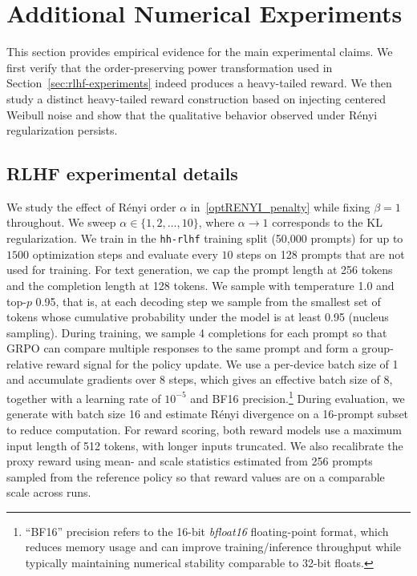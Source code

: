 \documentclass[11pt]{article}
\begin{document}
\section{Additional Numerical Experiments}\label{app:add_experiments}
This section provides empirical evidence for the main experimental claims. We first verify that the order-preserving power transformation used in Section~\ref{sec:rlhf-experiments} indeed produces a heavy-tailed reward. We then study a distinct heavy-tailed reward construction based on injecting centered Weibull noise and show that the qualitative behavior observed under R\'enyi regularization persists.

\subsection{RLHF experimental details}\label{app:rlhf_details}
We study the effect of R\'enyi order $\alpha$ in~\eqref{optRENYI_penalty} while fixing $\beta=1$ throughout. We sweep $\alpha\in\{1,2,\dots,10\}$, where $\alpha\to 1$ corresponds to the KL regularization. We train in the \texttt{hh-rlhf} training split (50{,}000 prompts) for up to $1500$ optimization steps and evaluate every $10$ steps on 128 prompts that are not used for training. For text generation, we cap the prompt length at 256 tokens and the completion length at 128 tokens. We sample with temperature 1.0 and top-$p$ 0.95, that is, at each decoding step we sample from the smallest set of tokens whose cumulative probability under the model is at least 0.95 (nucleus sampling). During training, we sample 4 completions for each prompt so that GRPO can compare multiple responses to the same prompt and form a group-relative reward signal for the policy update. We use a per-device batch size of 1 and accumulate gradients over 8 steps, which gives an effective batch size of 8, together with a learning rate of $10^{-5}$ and BF16 precision.\footnote{``BF16'' precision refers to the 16-bit \emph{bfloat16} floating-point format, which reduces memory usage and can improve training/inference throughput while typically maintaining numerical stability comparable to 32-bit floats.} During evaluation, we generate with batch size 16 and estimate R\'enyi divergence on a 16-prompt subset to reduce computation. For reward scoring, both reward models use a maximum input length of 512 tokens, with longer inputs truncated. We also recalibrate the proxy reward using mean- and scale statistics estimated from 256 prompts sampled from the reference policy so that reward values are on a comparable scale across runs.\\
\end{document}
